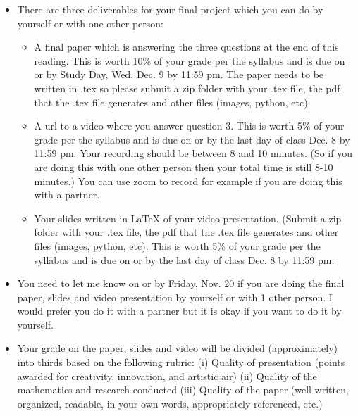 \documentclass[10pt,letterpaper]{article}
\begin{document}
\begin{itemize}



\item There are three deliverables for your final project which you can do by yourself or with one other person:
\begin{itemize}
\item A final paper which is answering the three questions at the end of this reading. This is worth 10\% of your grade per the syllabus and is due on or by Study Day, Wed. Dec. 9 by 11:59 pm. The paper needs to be written in .tex so please submit a zip folder with your .tex file, the pdf that the .tex file generates and other files (images, python, etc).

\item A url to a video where you answer question 3. This is worth 5\% of your grade per the syllabus and is due on or by the last day of class  Dec. 8 by 11:59 pm. Your recording should be between 8 and 10 minutes. (So if you are doing this with one other person then your total time is still 8-10 minutes.)
You can use zoom to record for example if you are doing this with a partner.

\item Your slides written in LaTeX of your video presentation. (Submit a zip folder with your .tex file, the pdf that the .tex file generates and other files (images, python, etc). This is worth 5\% of your grade per the syllabus and is due on or by the last day of class  Dec. 8 by 11:59 pm. 

\end{itemize}
\item You need to let me know on or by Friday, Nov. 20 if you are doing the final paper, slides and video presentation by yourself or with 1 other person.
 I would prefer you do it  with a partner but it is okay if you want to do it by yourself. 
 
 \item Your grade on the paper, slides and video will be divided (approximately) into thirds based on the following rubric:
(i) Quality of presentation (points awarded for creativity, innovation, and artistic air)
(ii) Quality of the mathematics and research conducted
(iii) Quality of the paper (well-written, organized, readable, in your own words, appropriately referenced, etc.)



\end{itemize}
\end{document}

